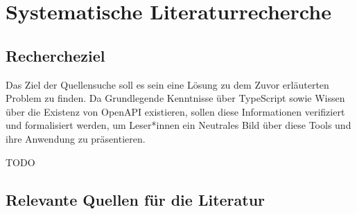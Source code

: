 
\section{Systematische Literaturrecherche}



\subsection{Rechercheziel}

Das Ziel der Quellensuche soll es sein eine Lösung zu dem Zuvor erläuterten Problem zu finden.
Da Grundlegende Kenntnisse über TypeScript sowie Wissen über die Existenz von OpenAPI existieren,
sollen diese Informationen verifiziert und formalisiert werden, um Leser*innen ein Neutrales Bild
über diese Tools und ihre Anwendung zu präsentieren.

TODO


\subsection{Relevante Quellen für die Literatur}

